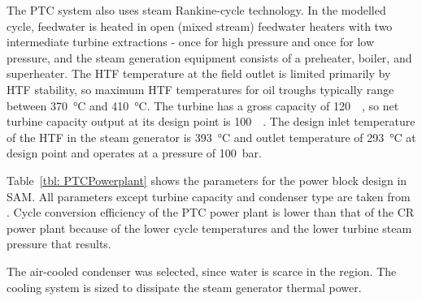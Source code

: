 The \ac{PTC} system also uses steam Rankine-cycle technology. In the modelled cycle, feedwater is heated in open (mixed stream) feedwater heaters with two intermediate turbine extractions - once for high pressure and once for low pressure, and the steam generation equipment consists of a preheater, boiler, and superheater. The \ac{HTF} temperature at the field outlet is limited primarily by \ac{HTF} stability, so maximum \ac{HTF} temperatures for oil troughs typically range between \SI{370}{\celsius} and \SI{410}{\celsius}. The turbine has a gross capacity of \SI{120}{\mega\wattel}, so net turbine capacity output at its design point is \SI{100}{\mega\wattel}. The design inlet temperature of the \ac{HTF} in the steam generator is \SI{393}{\celsius} and outlet temperature of \SI{293}{\celsius} at design point and operates at a pressure of \SI{100}{\bar}.

Table~\ref{tbl: PTCPowerplant} shows the parameters for the power block design in \ac{SAM}. All parameters except turbine capacity and condenser type are taken from \cite{Wagner2011}. Cycle conversion efficiency of the \ac{PTC} power plant is lower than that of the \ac{CR} power plant because of the lower cycle temperatures and the lower turbine steam pressure that results.




The air-cooled condenser was selected, since water is scarce in the region. The cooling system is sized to dissipate the steam generator thermal power. 

